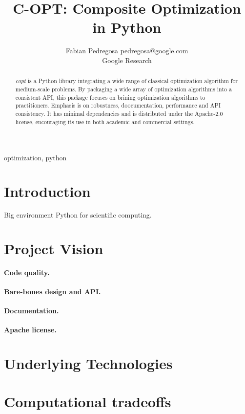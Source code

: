 \documentclass[twoside,11pt]{article}
\begin{document}
\title{C-OPT: Composite Optimization in Python}
\author{\name Fabian Pedregosa \email pedregosa@google.com \\
       \addr Google Research\\
}
\editor{}


\maketitle


\begin{abstract}
\emph{copt} is a Python library integrating a wide range of classical optimization algorithm for medium-scale problems. By packaging a wide array of optimization algorithms into a consistent API, this package focuses on brining optimization algorithms to practitioners. Emphasis is on robustness, doocumentation, performance and API consistency. It has minimal dependencies and is distributed under the Apache-2.0 license, encouraging its use in both academic and commercial settings.
\end{abstract}

\begin{keywords}
  optimization, python
\end{keywords}

\section{Introduction}

{\blue Big environment Python for scientific computing. \newcommand{\blue}{\color{blue}}
}

\section{Project Vision}

\paragraph{Code quality.}

\paragraph{Bare-bones design and API.}

\paragraph{Documentation.}

\paragraph{Apache license.}


\section{Underlying Technologies}

\citep{virtanen2019scipy}

\citep{pedregosa2011scikit}

\section{Computational tradeoffs}


\end{document}

